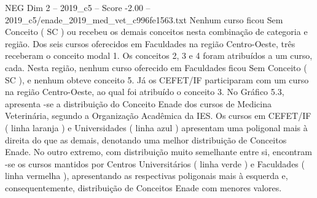 \begin{textsample}{NEG Dim 2 – 2019\_c5 – Score -2.00 – 2019\_c5/enade\_2019\_med\_vet\_c996fe1563.txt}
Nenhum curso ficou Sem Conceito ( SC ) ou recebeu os demais conceitos nesta combinação de categoria e região.
Dos seis cursos oferecidos em Faculdades na região Centro-Oeste, três receberam o conceito modal 1.
Os conceitos 2, 3 e 4 foram atribuídos a um curso, cada.
Nesta região, nenhum curso oferecido em Faculdades ficou Sem Conceito ( SC ), e nenhum obteve conceito 5.
Já os CEFET/IF participaram com um curso na região Centro-Oeste, ao qual foi atribuído o conceito 3.
No Gráfico 5.3, apresenta -se a distribuição do Conceito Enade dos cursos de Medicina Veterinária, segundo a Organização Acadêmica da IES.
Os cursos em CEFET/IF ( linha laranja ) e Universidades ( linha azul ) apresentam uma poligonal mais à direita do que as demais, denotando uma melhor distribuição de Conceitos Enade.
No outro extremo, com distribuição muito semelhante entre si, encontram -se os cursos mantidos por Centros Universitários ( linha verde ) e Faculdades ( linha vermelha ), apresentando as respectivas poligonais mais à esquerda e, consequentemente, distribuição de Conceitos Enade com menores valores.

\end{textsample}
